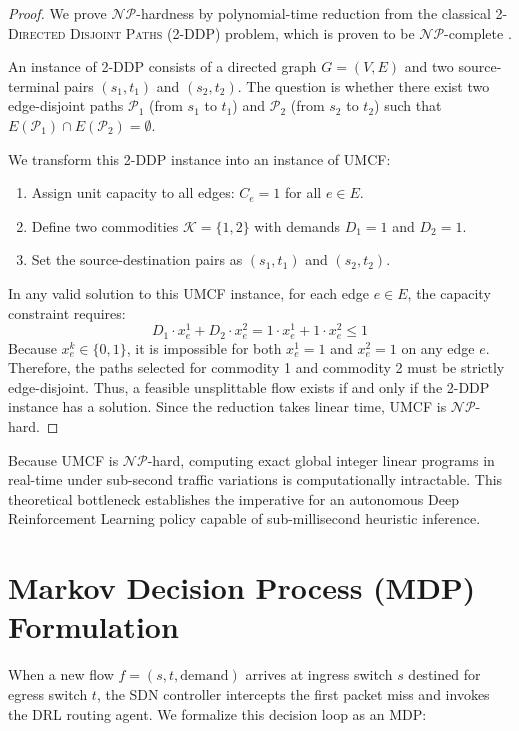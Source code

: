\begin{proof}
We prove $\mathcal{NP}$-hardness by polynomial-time reduction from the classical \textsc{2-Directed Disjoint Paths (2-DDP)} problem, which is proven to be $\mathcal{NP}$-complete \cite{garey1979computers}.

An instance of 2-DDP consists of a directed graph $G = (V, E)$ and two source-terminal pairs $(s_1, t_1)$ and $(s_2, t_2)$. The question is whether there exist two edge-disjoint paths $\mathcal{P}_1$ (from $s_1$ to $t_1$) and $\mathcal{P}_2$ (from $s_2$ to $t_2$) such that $E(\mathcal{P}_1) \cap E(\mathcal{P}_2) = \emptyset$.

We transform this 2-DDP instance into an instance of UMCF:
\begin{enumerate}
    \item Assign unit capacity to all edges: $C_e = 1$ for all $e \in E$.
    \item Define two commodities $\mathcal{K} = \{1, 2\}$ with demands $D_1 = 1$ and $D_2 = 1$.
    \item Set the source-destination pairs as $(s_1, t_1)$ and $(s_2, t_2)$.
\end{enumerate}
In any valid solution to this UMCF instance, for each edge $e \in E$, the capacity constraint requires:
\begin{equation}
    D_1 \cdot x_e^1 + D_2 \cdot x_e^2 = 1 \cdot x_e^1 + 1 \cdot x_e^2 \le 1
\end{equation}
Because $x_e^k \in \{0, 1\}$, it is impossible for both $x_e^1 = 1$ and $x_e^2 = 1$ on any edge $e$. Therefore, the paths selected for commodity 1 and commodity 2 must be strictly edge-disjoint. Thus, a feasible unsplittable flow exists if and only if the 2-DDP instance has a solution. Since the reduction takes linear time, UMCF is $\mathcal{NP}$-hard.
\end{proof}

Because UMCF is $\mathcal{NP}$-hard, computing exact global integer linear programs in real-time under sub-second traffic variations is computationally intractable. This theoretical bottleneck establishes the imperative for an autonomous Deep Reinforcement Learning policy capable of sub-millisecond heuristic inference.

\section{Markov Decision Process (MDP) Formulation}
When a new flow $f = (s, t, \text{demand})$ arrives at ingress switch $s$ destined for egress switch $t$, the SDN controller intercepts the first packet miss and invokes the DRL routing agent. We formalize this decision loop as an MDP:

